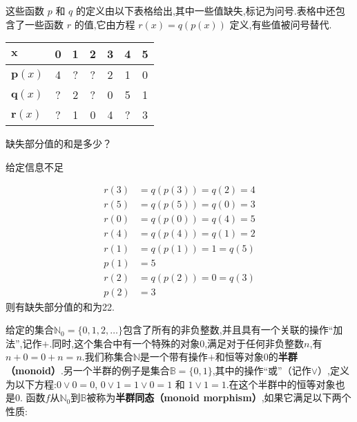 \documentclass[answers]{exam}
\begin{document}
\begin{questions}
	\question 这些函数 \( p \) 和 \( q \) 的定义由以下表格给出,其中一些值缺失,标记为问号.表格中还包含了一些函数 \( r
	\) 的值,它由方程 \( r(x) = q(p(x)) \) 定义,有些值被问号替代.

	\begin{tabularx}{0.8\textwidth}{|B|C|C|C|C|C|C|} \hline
		\(\mathbf x \)    & \textbf{0} & \textbf{1} & \textbf{2} & \textbf{3} & \textbf{4} & \textbf{5} \\ \hline
		\(\mathbf p(x) \) & 4          & ?          & ?          & 2          & 1          & 0          \\ \hline
		\(\mathbf q(x) \) & ?          & 2          & ?          & 0          & 5          & 1          \\ \hline
		\(\mathbf r(x) \) & ?          & 1          & 0          & 4          & ?          & 3          \\ \hline
	\end{tabularx}

	缺失部分值的和是多少？

	\begin{oneparchoices}
		    \choice 给定信息不足
	\end{oneparchoices}

	\begin{solution}
		\begin{align*}
			r(3) & = q(p(3)) = q(2) = 4   \\
			r(5) & = q(p(5)) = q(0) = 3   \\
			r(0) & = q(p(0)) = q(4) = 5   \\
			r(4) & = q(p(4)) = q(1) = 2   \\
			r(1) & = q(p(1)) = 1   = q(5) \\
			p(1) & = 5                    \\
			r(2) & = q(p(2)) = 0 = q(3)   \\
			p(2) & = 3
		\end{align*}
		则有缺失部分值的和为22.
	\end{solution}

	\question 给定的集合$\mathbb{N}_0 = \{0, 1, 2,
		\ldots\}$包含了所有的非负整数,并且具有一个关联的操作“加法”,记作$+$.同时,这个集合中有一个特殊的对象$0$,满足对于任何非负整数$n$,有$n
		+ 0 = 0 + n = n$.我们称集合$\mathbb{N}$是一个带有操作$+$和恒等对象$0$的\textbf{半群（monoid）}.另一个半群的例子是集合$\mathbb{B} = \{0, 1\}$,其中的操作“或”（记作$\vee$）,定义为以下方程:$0 \vee 0 = 0$, $0 \vee 1 = 1 \vee 0 = 1$ 和 $1 \vee 1 = 1$.在这个半群中的恒等对象也是$0$.
	函数$f$从$\mathbb{N}_0$到$\mathbb{B}$被称为\textbf{半群同态（monoid morphism）},如果它满足以下两个性质:


\end{questions}
\end{document}

